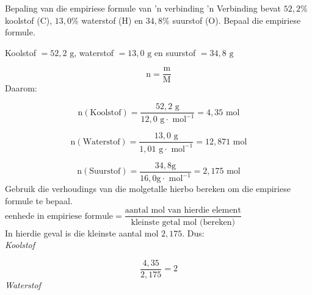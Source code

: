     \noindent
\label{m38712*secfhsst!!!underscore!!!id1029}
      \noindent 
      \begin{wex}{Bepaling van die empiriese formule van 'n verbinding}{
 'n Verbinding bevat $52,2\%$ koolstof ($\text{C}$), $13,0\%$ waterstof ($\text{H}$) en $34,8\%$ suurstof ($\text{O}$). Bepaal die empiriese formule.      
}
{ %
      \label{m38712*id280928}Koolstof $=52,2 \text{ g}$, waterstof $=13,0 \text{ g}$ en suurstof $=34,8 \text{ g}$ 
      \label{m38712*id280954}\nopagebreak\noindent{}
        
    \begin{equation*}
    \text{n}=\frac{\text{m}}{\text{M}}
      \end{equation*}
      \label{m38712*id280975}Daarom: 
      \label{m38712*id280978}\nopagebreak\noindent{}
        
    \begin{equation*}
    \text{n}\left(\text{Koolstof}\right)=\frac{52,2 \text{ g}}{12,0 \text{ g} \cdot \text{ mol}^{-1}}=4,35\text{ mol}
      \end{equation*}
      \label{m38712*id281042}\nopagebreak\noindent{}
        
    \begin{equation*}
    \text{n}\left(\text{Waterstof}\right)=\frac{13,0 \text{ g}}{1,01 \text{ g} \cdot \text{ mol}^{-1}}=12,871\text{ mol}
      \end{equation*}
      \label{m38712*id281111}\nopagebreak\noindent{}
        
    \begin{equation*}
    \text{n}\left(\text{Suurstof}\right)=\frac{34,8 \text{g}}{16,0 \text{g} \cdot \text{ mol}^{-1}}=2,175\text{ mol}
      \end{equation*}
Gebruik die verhoudings van die molgetalle hierbo bereken om die empiriese formule te bepaal.\\
$\text{eenhede in  empiriese formule} = \dfrac{\text{aantal mol van hierdie element}}{\text{kleinste getal mol (bereken)}}$\newline \\
In hierdie geval is die kleinste aantal mol $2,175$. Dus:\\ 
      \label{m38712*id281179}
        \textsl{Koolstof}
 
      \label{m38712*id281185}\nopagebreak\noindent{}
        
    \begin{equation*}
    \frac{4,35}{2,175}=2
      \end{equation*}
      \label{m38712*id281217}
        \textsl{Waterstof}
     
}
\end{wex}

